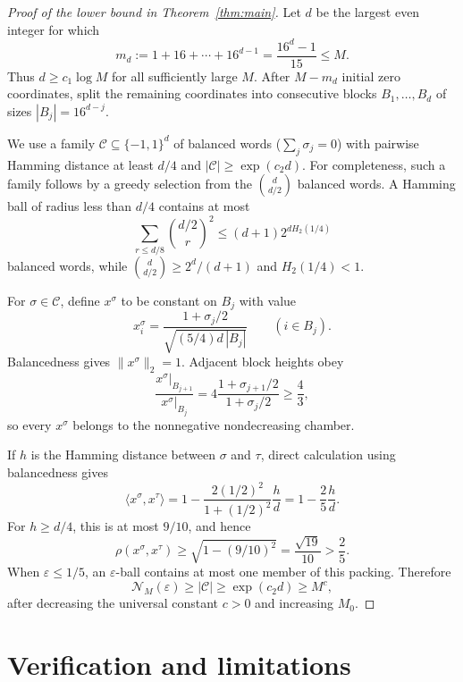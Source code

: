 \documentclass[11pt]{article}
\newcommand{\cN}{\mathcal N}
\begin{document}
\begin{proof}[Proof of the lower bound in Theorem~\ref{thm:main}]
Let $d$ be the largest even integer for which
\[
 m_d:=1+16+\cdots+16^{d-1}=\frac{16^d-1}{15}\leq M.
\]
Thus $d\geq c_1\log M$ for all sufficiently large $M$.  After $M-m_d$
initial zero coordinates, split the remaining coordinates into consecutive
blocks $B_1,\ldots,B_d$ of sizes
$|B_j|=16^{d-j}$.

We use a family $\mathcal C\subseteq\{-1,1\}^d$ of balanced words
($\sum_j\sigma_j=0$) with pairwise Hamming distance at least $d/4$ and
$|\mathcal C|\geq\exp(c_2d)$.  For completeness, such a family follows by a
greedy selection from the $\binom d{d/2}$ balanced words.  A Hamming ball of
radius less than $d/4$ contains at most
\[
 \sum_{r\leq d/8}\binom{d/2}{r}^2
 \leq(d+1)2^{dH_2(1/4)}
\]
balanced words, while
$\binom d{d/2}\geq2^d/(d+1)$ and $H_2(1/4)<1$.

For $\sigma\in\mathcal C$, define $x^\sigma$ to be constant on $B_j$ with
value
\begin{equation}\label{eq:packingvector}
 x^\sigma_i=
 \frac{1+\sigma_j/2}{\sqrt{(5/4)d\,|B_j|}}
 \qquad(i\in B_j).
\end{equation}
Balancedness gives $\|x^\sigma\|_2=1$.  Adjacent block heights obey
\[
 \frac{x^\sigma|_{B_{j+1}}}{x^\sigma|_{B_j}}
 =4\frac{1+\sigma_{j+1}/2}{1+\sigma_j/2}\geq\frac43,
\]
so every $x^\sigma$ belongs to the nonnegative nondecreasing chamber.

If $h$ is the Hamming distance between $\sigma$ and $\tau$, direct calculation
using balancedness gives
\[
 \langle x^\sigma,x^\tau\rangle
 =1-\frac{2(1/2)^2}{1+(1/2)^2}\frac hd
 =1-\frac25\frac hd.
\]
For $h\geq d/4$, this is at most $9/10$, and hence
\[
 \rho(x^\sigma,x^\tau)
 \geq\sqrt{1-(9/10)^2}=\frac{\sqrt{19}}{10}>\frac25.
\]
When $\varepsilon\leq1/5$, an $\varepsilon$-ball contains at most one member
of this packing.  Therefore
\[
 \cN_M(\varepsilon)\geq|\mathcal C|
 \geq\exp(c_2d)\geq M^c,
\]
after decreasing the universal constant $c>0$ and increasing $M_0$.
\end{proof}

\section{Verification and limitations}
\end{document}
